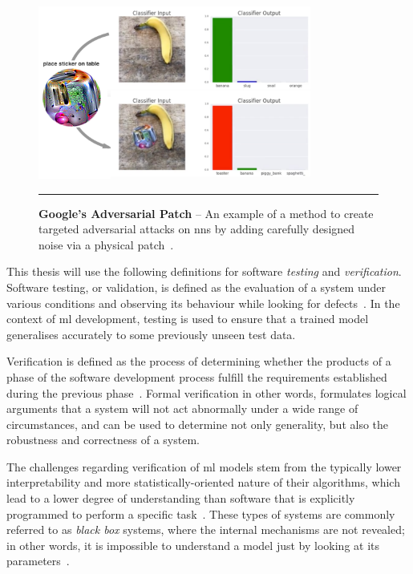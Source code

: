 \begin{figure}[H]
	\centering
        \includegraphics[width=0.8\textwidth]{media/introduction/sticker.png}
        \rule{35em}{0.5pt}
        \caption[Google's adversarial patch]{\textbf{Google's Adversarial Patch} -- An example of a method to create targeted adversarial attacks on \glspl{nn} by adding carefully designed noise via a physical patch~\citep{brown2018}.}\label{fig:adversarialpatch}
\end{figure}

This thesis will use the following definitions for software \textit{testing} and \textit{verification}.
Software testing, or validation, is defined as the evaluation of a system under various conditions and observing its behaviour while
looking for defects~\citep{pereira}. In the context of \gls{ml} development, testing is used to
ensure that a trained model generalises accurately to some previously unseen test data.

Verification is defined as the process of determining whether the products of a phase of the software development process fulfill
the requirements established during the previous phase~\citep{ammann2008}. Formal verification in other words, formulates logical arguments
that a system will not act abnormally under a wide range of circumstances, and can be used to determine not only generality, but also the robustness and correctness of a system.

The challenges regarding verification of \gls{ml} models stem from the typically lower interpretability and more statistically-oriented nature of their algorithms, which
lead to a lower degree of understanding than software that is explicitly programmed to perform a specific task~\citep{bishop}. These types of systems are
commonly referred to as \textit{black box} systems, where the internal mechanisms are not revealed; in other words, it is impossible to understand a model just by
looking at its parameters~\citep{molnar2019}.

